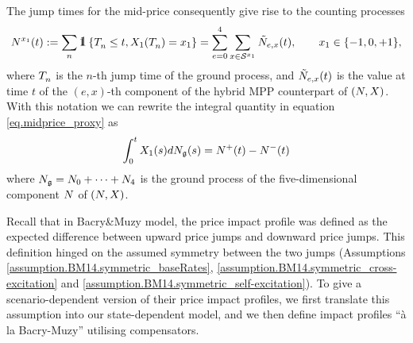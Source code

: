 \documentclass[10pt, article,table]{article}
\begin{document}
The jump times for the mid-price consequently give rise to the counting processes 
\begin{equation}\label{eq.jump_times}
 \countingProc[]^{x_{1}}(t) := \sum_{n}\one\left\lbrace \arrivalTimes[]_n\leq t , \stateVariable_1(\arrivalTimes[]_n) = x_1 \right\rbrace
 =
 \sum_{e=0}^{4} \sum_{x\in\stateSpace^{x_1}} \hybridHawkes_{e,x}(t),
 \qquad x_1 \in \lbrace-1,0,+1\rbrace,
\end{equation}
where $\arrivalTimes[]_n$ is the $n$-th jump time of the ground process, and $\hybridHawkes_{e,x}(t)$ is the value at time $t$ of the $(e,x)$-th component of the hybrid MPP counterpart of $(\multiCountingProc,\stateVariable)$.
With this notation we can rewrite the integral quantity in equation \eqref{eq.midprice_proxy} as 
\begin{equation*}
 \intzerot \stateVariable_1 (s)d\groundProc(s)
 =
 \countingProc[]^{+}(t) - \countingProc[]^{-}(t)
\end{equation*}
where $\groundProc = \countingProc[0] + \dots + \countingProc[4]$ is the ground process of the five-dimensional component $\multiCountingProc$ of $(\multiCountingProc,\stateVariable)$.

Recall that in Bacry\&Muzy model, the price impact profile was defined as the expected difference between upward price jumps and downward price jumps. This definition hinged on the assumed symmetry between the two jumps (Assumptions \ref{assumption.BM14.symmetric_baseRates}, \ref{assumption.BM14.symmetric_cross-excitation} and \ref{assumption.BM14.symmetric_self-excitation}). To give a scenario-dependent version of their price impact profiles, we first translate this assumption into our state-dependent model, and we then define impact profiles ``\`a la Bacry-Muzy'' utilising compensators. 
\end{document}
